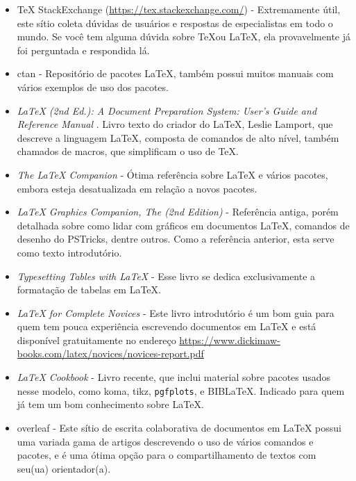 \begin{itemize}
	\item \TeX{} StackExchange (\url{https://tex.stackexchange.com/}) - Extremamente útil, este sítio coleta dúvidas de usuários e respostas de especialistas em todo o mundo. Se você tem alguma dúvida sobre \TeX ou \LaTeX , ela provavelmente já foi perguntada e respondida lá.
	
	\item \gls{ctan} - Repositório de pacotes \LaTeX , também possui muitos manuais com vários exemplos de uso dos pacotes.
	
	\item \textit{\LaTeX{} (2nd Ed.): A Document Preparation System: User's Guide and Reference Manual} \parencite{Lamport1994}. Livro texto do criador do \LaTeX{}, Leslie Lamport, que descreve a linguagem \LaTeX{}, composta de comandos de alto nível, também chamados de macros, que simplificam o uso de \TeX{}.
	
	\item \textit{The \LaTeX{} Companion} \parencite{Mittelbach1999} - Ótima referência sobre \LaTeX{} e vários pacotes, embora esteja desatualizada em relação a novos pacotes.
	
	\item \textit{\LaTeX{} Graphics Companion, The (2nd Edition)} \parencite{Goosens2007} - Referência antiga, porém detalhada sobre como lidar com gráficos em documentos \LaTeX{}, comandos de desenho do PSTricks, dentre outros. Como a referência anterior, esta serve como texto introdutório. 
	
	\item \textit{Typesetting Tables with \LaTeX{}} \parencite{Voss2011} - Esse livro se dedica exclusivamente a formatação de tabelas em \LaTeX{}.
	
	\item \textit{\LaTeX{} for Complete Novices} \parencite{Talbot2012} - Este livro introdutório é um bom guia para quem tem pouca experiência escrevendo documentos em \LaTeX{} e está disponível gratuitamente no endereço \url{https://www.dickimaw-books.com/latex/novices/novices-report.pdf} 
	
	\item \textit{\LaTeX{} Cookbook} \parencite{Kottwitz2015} - Livro recente, que inclui material sobre pacotes usados nesse modelo, como \gls{koma}, \gls{tikz}, \texttt{pgfplots}, e BIB\LaTeX{}. Indicado para quem já tem um bom conhecimento sobre \LaTeX{}.
	
	\item \gls{overleaf} - Este sítio de escrita colaborativa de documentos em \LaTeX{} possui uma variada gama de artigos descrevendo o uso de vários comandos e pacotes, e é uma ótima opção para o compartilhamento de textos com seu(ua) orientador(a).
	
\end{itemize}


